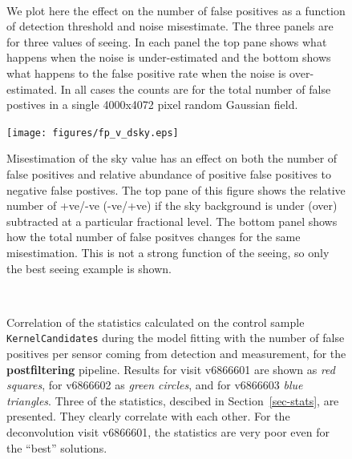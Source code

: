\documentclass[prd, nofootinbib, floatfix, 11pt,tightenlines,times]{article}
\begin{document}
\begin{figure}
\centering
{}\qquad
{}\\
\caption{
We plot here the effect on the number of false positives as a function of detection threshold and noise misestimate.  The three panels 
are for three values of seeing.  In each panel the top pane shows what happens when the noise is under-estimated and the
bottom shows what happens to the false positive rate when the noise is over-estimated.  In all cases the counts are for
the total number of false postives in a single 4000x4072 pixel random Gaussian field.
}
\label{fig-fpthresh}
\end{figure}

\begin{figure}
\texttt{[image: figures/fp\_v\_dsky.eps]}
\caption{
Misestimation of the sky value has an effect on both the number of false positives and relative abundance of positive false positives to negative false postives.
The top pane of this figure shows the relative number of +ve/-ve (-ve/+ve) if the sky background is under (over) subtracted at a particular fractional level.  The 
bottom panel shows how the total number of false positves changes for the same misestimation.  This is not a strong function of the seeing, so only the best
seeing example is shown.
}
\label{fig-skythresh}
\end{figure}


\begin{figure}
 \\
\caption{Correlation of the statistics calculated on the control
  sample {\tt KernelCandidates} during the model fitting with the
  number of false positives per sensor coming from
  detection and measurement, for the {\bf postfiltering} pipeline.
  Results for visit v6866601 are shown as {\it red squares}, for
  v6866602 as {\it green circles}, and for v6866603 {\it blue
    triangles}.  Three of the statistics, descibed in
  Section~\ref{sec-stats}, are presented.  They clearly correlate with
  each other.  For the deconvolution visit v6866601, the statistics
  are very poor even for the ``best'' solutions.  
}
\label{corrpost}
\end{figure}
\end{document}
